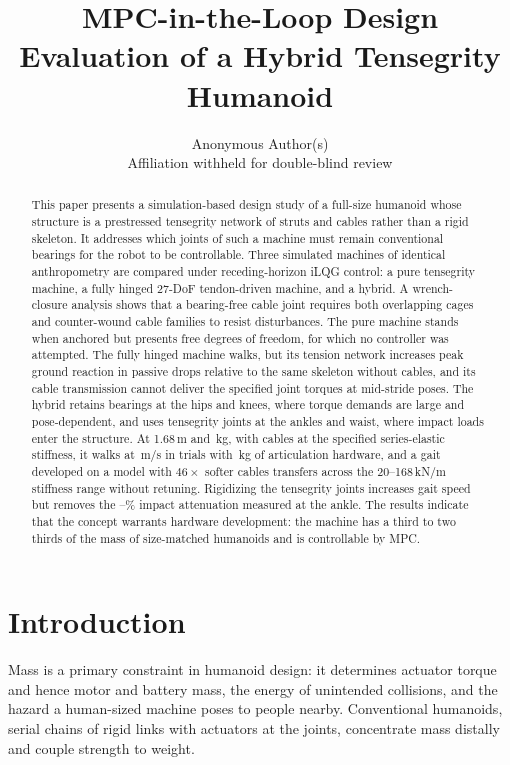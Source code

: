 \documentclass[letterpaper, 10pt, conference]{ieeeconf}
\title{MPC-in-the-Loop Design Evaluation of a Hybrid Tensegrity Humanoid}
\author{Anonymous Author(s)\\ Affiliation withheld for double-blind review}
\begin{document}
\maketitle

\begin{abstract}
This paper presents a simulation-based design study of a full-size
humanoid whose structure is a prestressed tensegrity network of struts and
cables rather than a rigid skeleton. It addresses which joints of such a
machine must remain conventional bearings for the robot to be
controllable. Three simulated machines of identical anthropometry are compared
under receding-horizon iLQG control: a pure tensegrity machine, a fully
hinged 27-DoF tendon-driven machine, and a hybrid. A wrench-closure
analysis shows that a bearing-free cable joint requires both overlapping
cages and counter-wound cable families to resist disturbances. The pure
machine stands when anchored but presents \cgDof{} free degrees of
freedom, for which no controller was attempted. The fully hinged machine
walks, but its tension network increases peak ground reaction in passive
drops relative to the same skeleton without cables, and its cable
transmission cannot deliver the specified joint torques at mid-stride
poses. The hybrid retains bearings at the hips and knees, where torque
demands are large and pose-dependent, and uses tensegrity joints at the
ankles and waist, where impact loads enter the structure. At 1.68\,m and
\hybridMass\,kg, with cables at the specified series-elastic stiffness,
it walks at \headV\,m/s in \headRate{} trials with \hybridJointHw\,kg of
articulation hardware, and a gait developed on a model with $46\times$
softer cables transfers across the 20--168\,kN/m stiffness range without
retuning. Rigidizing the tensegrity joints increases gait speed but
removes the \jointImpactLo--\jointImpactHi\% impact attenuation measured
at the ankle. The results indicate that the concept warrants hardware
development: the machine has a third to two thirds of the mass of size-matched
humanoids and is controllable by MPC.
\end{abstract}


\section{Introduction}
Mass is a primary constraint in humanoid design: it determines actuator
torque and hence motor and battery mass, the energy of unintended
collisions, and the hazard a human-sized machine poses to people nearby.
Conventional humanoids, serial chains of rigid links with actuators at the
joints, concentrate mass distally and couple strength to weight.
\end{document}

